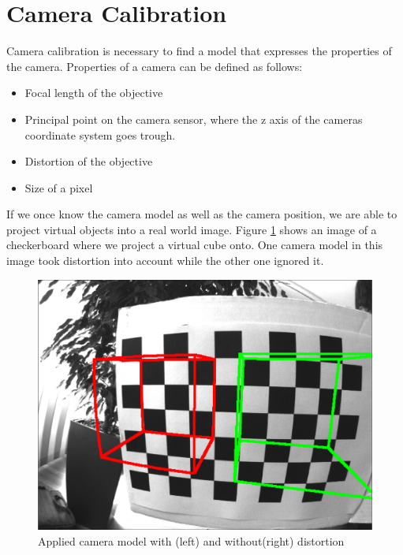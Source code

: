 \documentclass[11pt,a4paper,titlepage,oneside]{report}
\begin{document}
\section{Camera Calibration}\label{sec:calibration}
Camera calibration is necessary to find a model that expresses the properties of the camera. Properties of a camera can be defined as follows:
\begin{itemize}
	\item Focal length of the objective
	\item Principal point on the camera sensor, where the z axis of the cameras coordinate system goes trough.
	\item Distortion of the objective
	\item Size of a pixel
\end{itemize}
If we once know the camera model as well as the camera position, we are able to project virtual objects into a real world image. Figure \ref{fig:model} shows an image of a checkerboard where we project a virtual cube onto. One camera model in this image took distortion into account while the other one ignored it.
\begin{figure}[H]
  \begin{center}
		\includegraphics[width=1.0\textwidth]{img/model.png}
  \end{center}
	\caption{Applied camera model with (left) and without(right) distortion}\label{fig:model}
\end{figure}
\end{document}
